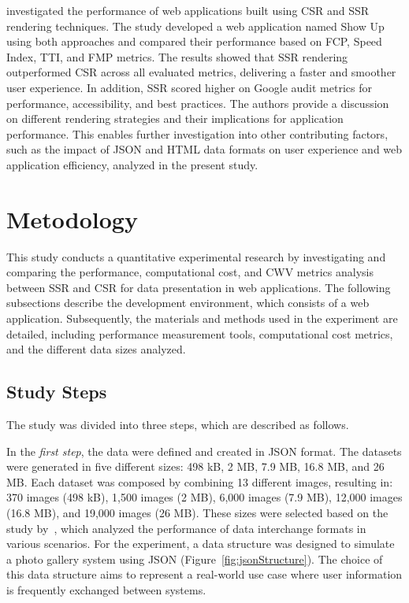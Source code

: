 \documentclass{sbc2019}%
\begin{document}
\citet{clientServerSide:2020} investigated the performance of web applications built using CSR and SSR rendering techniques. The study developed a web application named Show Up using both approaches and compared their performance based on FCP, Speed Index, TTI, and FMP metrics. The results showed that SSR rendering outperformed CSR across all evaluated metrics, delivering a faster and smoother user experience. In addition, SSR scored higher on Google audit metrics for performance, accessibility, and best practices. The authors provide a discussion on different rendering strategies and their implications for application performance. This enables further investigation into other contributing factors, such as the impact of JSON and HTML data formats on user experience and web application efficiency, analyzed in the present study.

\section{Metodology}\label{sec:materiais}

This study conducts a quantitative experimental research by investigating and comparing the performance, computational cost, and CWV metrics analysis between SSR and CSR for data presentation in web applications. The following subsections describe the development environment, which consists of a web application. Subsequently, the materials and methods used in the experiment are detailed, including performance measurement tools, computational cost metrics, and the different data sizes analyzed.

\subsection{Study Steps}

The study was divided into three steps, which are described as follows.


In the \textit{first step}, the data were defined and created in JSON format. The datasets were generated in five different sizes: 498 kB, 2 MB, 7.9 MB, 16.8 MB, and 26 MB. Each dataset was composed by combining 13 different images, resulting in: 370 images (498 kB), 1,500 images (2 MB), 6,000 images (7.9 MB), 12,000 images (16.8 MB), and 19,000 images (26 MB).
These sizes were selected based on the study by~\citet{jsonXmlCaseStudy:2009}, which analyzed the performance of data interchange formats in various scenarios. For the experiment, a data structure was designed to simulate a photo gallery system using JSON (Figure~\ref{fig:jsonStructure}). The choice of this data structure aims to represent a real-world use case where user information is frequently exchanged between systems.
\end{document}
